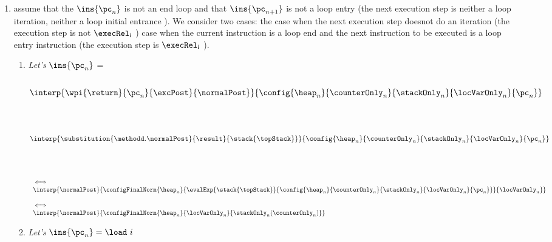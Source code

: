   
\begin{enumerate}
  \item assume that the  $\ins{\pc_{n}}$ is not an end loop and that $\ins{\pc_{n + 1}}$ is not a loop entry 
  (the next execution step is neither a loop iteration, neither a loop initial entrance ). We consider two cases: the case when the next execution step doesnot do an iteration (the execution step is not  $\execRel_l$ ) case when the current instruction is a loop end and the next instruction to be executed is a loop entry instruction (the execution step is $\execRel_l$ ). 
 
   \begin{enumerate} 
		\item   \textit{Let's} $\ins{\pc_n}$ = \return \\
		    	 \\
			$$ \interp{\wpi{\return}{\pc_{n}}{\excPost}{\normalPost}} {\config{\heap_n}{\counterOnly_n}{\stackOnly_n}{\locVarOnly_n}{\pc_n}} $$ \\
			 \\
			 
                        $$ \interp {\substitution{ \methodd.\normalPost }{ \result }{\stack{\topStack} }}  { \config{\heap_n}{\counterOnly_n}{\stackOnly_n}{\locVarOnly_n}{\pc_n} }  $$\\
			\\
			
			$$ \begin{array}{l}
			           \iff \\ 
                                   \interp { \normalPost} { \configFinalNorm{\heap_n }
                                                                       { \evalExp{ \stack{\topStack}}{\config{\heap_n}{\counterOnly_n}{\stackOnly_n}{\locVarOnly_n}{\pc_n} } }
                                                                       {\locVarOnly_n } }\\
			           \\ 
			          \iff \\
				   \interp{ \normalPost} { \configFinalNorm{\heap_n }
                                                            {\locVarOnly_n }   
							    { \stackOnly_n( \counterOnly_n )  } } 
			\end{array} $$
	
			


	      \item   \textit{Let's} $\ins{\pc_n} = \load \ i $ \\
	                  


\end{enumerate}
\end{enumerate}
